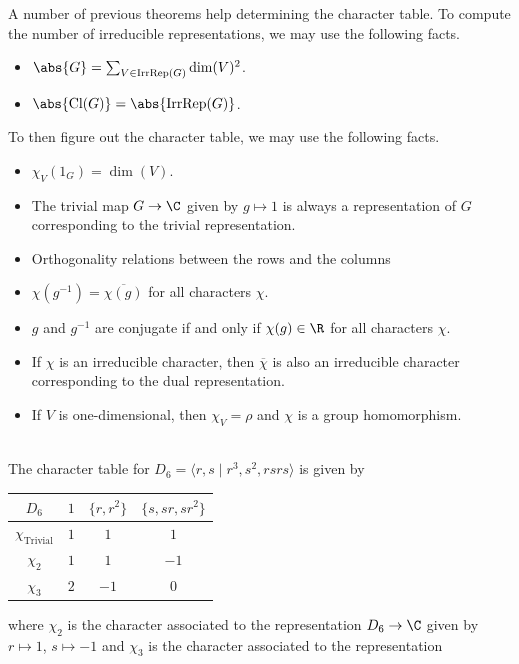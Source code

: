 \documentclass[a4paper]{article}
\begin{document}
A number of previous theorems help determining the character table. To compute the number of irreducible representations, we may use the following facts. 
\begin{itemize}
\item $\abs{G}=\sum_{V\in\text{IrrRep}(G)}\dim(V)^2$. 
\item $\abs{\text{Cl}(G)}=\abs{\text{IrrRep}(G)}$. 
\end{itemize}
To then figure out the character table, we may use the following facts. 
\begin{itemize}
\item $\chi_V(1_G)=\dim(V)$. 
\item The trivial map $G\to\C$ given by $g\mapsto 1$ is always a representation of $G$ corresponding to the trivial representation. 
\item Orthogonality relations between the rows and the columns
\item $\chi(g^{-1})=\overline{\chi(g)}$ for all characters $\chi$. 
\item $g$ and $g^{-1}$ are conjugate if and only if $\chi(g)\in\R$ for all characters $\chi$. 
\item If $\chi$ is an irreducible character, then $\overline{\chi}$ is also an irreducible character corresponding to the dual representation. 
\item If $V$ is one-dimensional, then $\chi_V=\rho$ and $\chi$ is a group homomorphism. 
\end{itemize}

\begin{eg}{}{}\\
The character table for $D_6=\langle r,s\;|\;r^3,s^2,rsrs\rangle$ is given by 
\begin{center}
\begin{tabular}{ c|ccc } 
$D_6$ & $1$ & $\{r,r^2\}$ & $\{s,sr,sr^2\}$ \\\hline
$\chi_{\text{Trivial}}$ & $1$ & $1$ & $1$\\
$\chi_2$ & $1$ & $1$ & $-1$\\
$\chi_3$ & $2$ & $-1$ & $0$\\
\end{tabular}
\end{center}
where $\chi_2$ is the character associated to the representation $D_6\to\C$ given by $r\mapsto 1$, $s\mapsto -1$ and $\chi_3$ is the character associated to the representation 
\end{eg}
\end{document}
